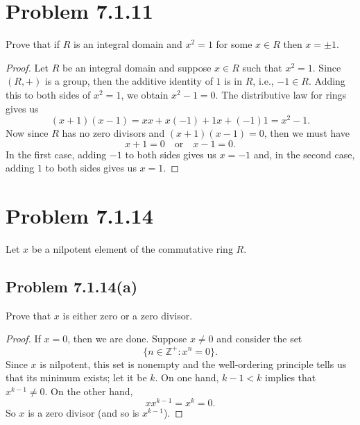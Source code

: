 \documentclass[12pt]{article}
\newenvironment{problem}
    {\begin{lrbox}{\mybox}\begin{minipage}{0.98\textwidth}}
    {\end{minipage}\end{lrbox}\begin{center}\framebox[\textwidth]{\usebox{\mybox}}\end{center}}
\theoremstyle{definition}
\newcommand{\isp}[1]{\quad\text{#1}\quad}
\newcommand{\Z}{\mathbb{Z}}
\begin{document}
\newpage
\section{Problem 7.1.11}
\begin{problem}
    Prove that if $R$ is an integral domain and $x^2 = 1$ for some $x \in R$ then $x = \pm 1$.
\end{problem}

\begin{proof}
    Let $R$ be an integral domain and suppose $x \in R$ such that $x^2 = 1$. Since $(R, +)$ is a group, then the additive identity of $1$ is in $R$, i.e., $-1 \in R$. Adding this to both sides of $x^2 = 1$, we obtain $x^2 - 1 = 0$. The distributive law for rings gives us
    \[
        (x + 1)(x - 1) = xx + x(-1) + 1x + (-1)1 = x^2 - 1.
    \]
    Now since $R$ has no zero divisors and $(x + 1)(x - 1) = 0$, then we must have
    \[
        x + 1 = 0 \isp{or} x - 1 = 0.
    \]
    In the first case, adding $-1$ to both sides gives us $x = -1$ and, in the second case, adding $1$ to both sides gives us $x = 1$.
    
\end{proof}

\newpage
\section{Problem 7.1.14}
\begin{problem}
    Let $x$ be a nilpotent element of the commutative ring $R$.
\end{problem}

\subsection{Problem 7.1.14(a)}
\begin{problem}
    Prove that $x$ is either zero or a zero divisor.
\end{problem}

\begin{proof}
    If $x = 0$, then we are done. Suppose $x \ne 0$ and consider the set
    \[
        \{n \in \Z^+ : x^n = 0\}.
    \]
    Since $x$ is nilpotent, this set is nonempty and the well-ordering principle tells us that its minimum exists; let it be $k$. On one hand, $k - 1 < k$ implies that $x^{k - 1} \ne 0$. On the other hand,
    \[
        xx^{k - 1} = x^k = 0.
    \]
    So $x$ is a zero divisor (and so is $x^{k-1}$).

\end{proof}
\end{document}
